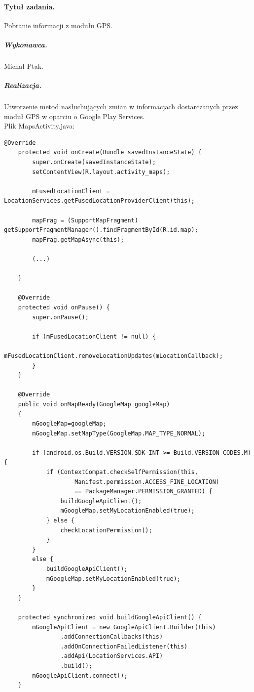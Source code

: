 \documentclass[a4paper]{article}
\begin{document}
\paragraph{Tytuł zadania.} Pobranie informacji z modułu GPS.
\subparagraph{Wykonawca.} Michał Ptak.
\subparagraph{Realizacja.} Utworzenie metod nasłuchujących zmian w informacjach dostarczanych przez moduł GPS w oparciu o Google Play Services.\\
Plik MapsActivity.java:
\begin{lstlisting}[style=java]
    @Override
    protected void onCreate(Bundle savedInstanceState) {
        super.onCreate(savedInstanceState);
        setContentView(R.layout.activity_maps);

        mFusedLocationClient = LocationServices.getFusedLocationProviderClient(this);

        mapFrag = (SupportMapFragment) getSupportFragmentManager().findFragmentById(R.id.map);
        mapFrag.getMapAsync(this);

        (...)      

    }

    @Override
    protected void onPause() {
        super.onPause();

        if (mFusedLocationClient != null) {
            mFusedLocationClient.removeLocationUpdates(mLocationCallback);
        }
    }

    @Override
    public void onMapReady(GoogleMap googleMap)
    {
        mGoogleMap=googleMap;
        mGoogleMap.setMapType(GoogleMap.MAP_TYPE_NORMAL);

        if (android.os.Build.VERSION.SDK_INT >= Build.VERSION_CODES.M) {
            if (ContextCompat.checkSelfPermission(this,
                    Manifest.permission.ACCESS_FINE_LOCATION)
                    == PackageManager.PERMISSION_GRANTED) {
                buildGoogleApiClient();
                mGoogleMap.setMyLocationEnabled(true);
            } else {
                checkLocationPermission();
            }
        }
        else {
            buildGoogleApiClient();
            mGoogleMap.setMyLocationEnabled(true);
        }
    }

    protected synchronized void buildGoogleApiClient() {
        mGoogleApiClient = new GoogleApiClient.Builder(this)
                .addConnectionCallbacks(this)
                .addOnConnectionFailedListener(this)
                .addApi(LocationServices.API)
                .build();
        mGoogleApiClient.connect();
    }


\end{lstlisting}
\end{document}
